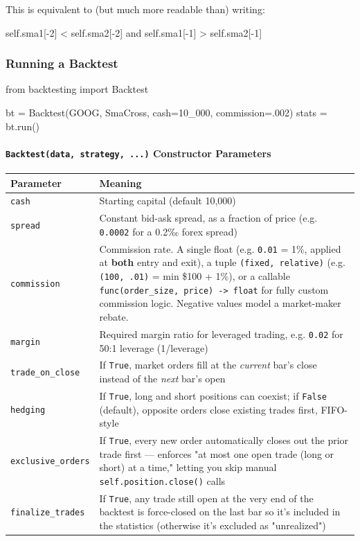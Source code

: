 \documentclass[12pt,openany]{book}
\theoremstyle{definition}
\theoremstyle{remark}
\begin{document}
This is equivalent to (but much more readable than) writing:

\begin{python}
self.sma1[-2] < self.sma2[-2] and self.sma1[-1] > self.sma2[-1]
\end{python}
\subsubsection{Running a Backtest}

\begin{python}
from backtesting import Backtest

bt = Backtest(GOOG, SmaCross, cash=10_000, commission=.002)
stats = bt.run()
\end{python}

\paragraph{\texttt{Backtest(data, strategy, ...)} Constructor Parameters}

\begin{longtable}{@{}L{0.46\textwidth}L{0.46\textwidth}@{}}
\toprule
\textbf{Parameter} & \textbf{Meaning} \\
\midrule
\texttt{cash} & Starting capital (default 10,000) \\
\texttt{spread} & Constant bid-ask spread, as a fraction of price (e.g. \texttt{0.0002} for a 0.2‰ forex spread) \\
\texttt{commission} & Commission rate. A single float (e.g. \texttt{0.01} = 1\%, applied at \textbf{both} entry and exit), a tuple \texttt{(fixed, relative)} (e.g. \texttt{(100, .01)} = min \$100 + 1\%), or a callable \texttt{func(order\_size, price) -> float} for fully custom commission logic. Negative values model a market-maker rebate. \\
\texttt{margin} & Required margin ratio for leveraged trading, e.g. \texttt{0.02} for 50:1 leverage (1/leverage) \\
\texttt{trade\_on\_close} & If \texttt{True}, market orders fill at the \emph{current} bar's close instead of the \emph{next} bar's open \\
\texttt{hedging} & If \texttt{True}, long and short positions can coexist; if \texttt{False} (default), opposite orders close existing trades first, FIFO-style \\
\texttt{exclusive\_orders} & If \texttt{True}, every new order automatically closes out the prior trade first — enforces "at most one open trade (long or short) at a time," letting you skip manual \texttt{self.position.close()} calls \\
\texttt{finalize\_trades} & If \texttt{True}, any trade still open at the very end of the backtest is force-closed on the last bar so it's included in the statistics (otherwise it's excluded as "unrealized") \\
\bottomrule
\end{longtable}
\end{document}
